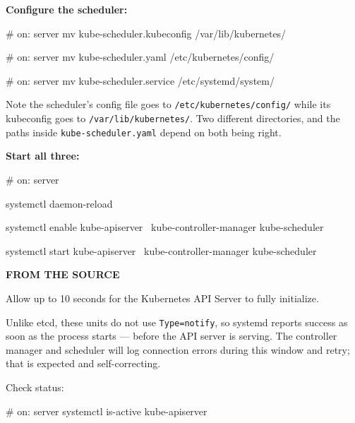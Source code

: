 \documentclass[11pt,oneside]{report}
\newcommand{\calloutlabel}[2]{{\sffamily\bfseries\footnotesize\color{#1}#2\quad}}
\begin{document}
\textbf{Configure
the scheduler:}

\begin{cmdlst}
# on: server
mv kube-scheduler.kubeconfig /var/lib/kubernetes/
\end{cmdlst}

\begin{cmdlst}
# on: server
mv kube-scheduler.yaml /etc/kubernetes/config/
\end{cmdlst}

\begin{cmdlst}
# on: server
mv kube-scheduler.service /etc/systemd/system/
\end{cmdlst}

Note the scheduler's
config file goes to
\texttt{/}\allowbreak{}\texttt{etc/}\allowbreak{}\texttt{kubernetes/}\allowbreak{}\texttt{config/}\allowbreak{}
while its kubeconfig
goes to
\texttt{/}\allowbreak{}\texttt{var/}\allowbreak{}\texttt{lib/}\allowbreak{}\texttt{kubernetes/}\allowbreak{}.
Two different
directories, and the
paths inside
\texttt{kube-}\allowbreak{}\texttt{scheduler.}\allowbreak{}\texttt{yaml}
depend on both being
right.

\textbf{Start all
three:}

\begin{cmdlst}
# on: server
{
  systemctl daemon-reload

  systemctl enable kube-apiserver \
    kube-controller-manager kube-scheduler

  systemctl start kube-apiserver \
    kube-controller-manager kube-scheduler
}
\end{cmdlst}

\begin{notebox}\calloutlabel{steel}{FROM THE SOURCE}

Allow up to 10
seconds for the
Kubernetes API
Server to fully
initialize.

\end{notebox}

Unlike etcd, these
units do not use
\texttt{Type=notify},
so systemd reports
success as soon as
the process starts
--- before the API
server is serving.
The controller
manager and
scheduler will log
connection errors
during this window
and retry; that is
expected and
self-correcting.

Check status:

\begin{cmdlst}
# on: server
systemctl is-active kube-apiserver
\end{cmdlst}
\end{document}
